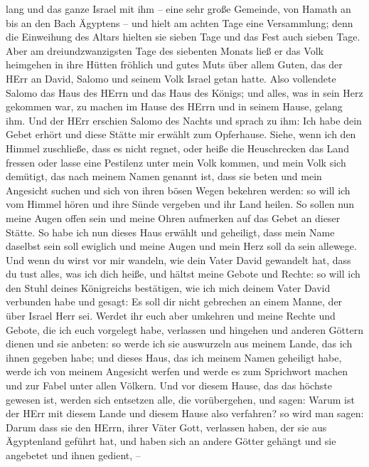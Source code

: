 lang und das ganze Israel mit ihm -- eine sehr große Gemeinde, von
Hamath an bis an den Bach Ägyptens --  und hielt am achten
Tage eine Versammlung; denn die Einweihung des Altars hielten sie sieben
Tage und das Fest auch sieben Tage.  Aber am
dreiundzwanzigsten Tage des siebenten Monats ließ er das Volk heimgehen
in ihre Hütten fröhlich und gutes Muts über allem Guten, das der HErr an
David, Salomo und seinem Volk Israel getan hatte.  Also
vollendete Salomo das Haus des HErrn und das Haus des Königs; und alles,
was in sein Herz gekommen war, zu machen im Hause des HErrn und in
seinem Hause, gelang ihm.  Und der HErr erschien Salomo des
Nachts und sprach zu ihm: Ich habe dein Gebet erhört und diese Stätte
mir erwählt zum Opferhause.  Siehe, wenn ich den Himmel
zuschließe, dass es nicht regnet, oder heiße die Heuschrecken das Land
fressen oder lasse eine Pestilenz unter mein Volk kommen, 
und mein Volk sich demütigt, das nach meinem Namen genannt ist, dass sie
beten und mein Angesicht suchen und sich von ihren bösen Wegen bekehren
werden: so will ich vom Himmel hören und ihre Sünde vergeben und ihr
Land heilen.  So sollen nun meine Augen offen sein und
meine Ohren aufmerken auf das Gebet an dieser Stätte.  So
habe ich nun dieses Haus erwählt und geheiligt, dass mein Name daselbst
sein soll ewiglich und meine Augen und mein Herz soll da sein allewege.
 Und wenn du wirst vor mir wandeln, wie dein Vater David
gewandelt hat, dass du tust alles, was ich dich heiße, und hältst meine
Gebote und Rechte:  so will ich den Stuhl deines
Königreichs bestätigen, wie ich mich deinem Vater David verbunden habe
und gesagt: Es soll dir nicht gebrechen an einem Manne, der über Israel
Herr sei.  Werdet ihr euch aber umkehren und meine Rechte
und Gebote, die ich euch vorgelegt habe, verlassen und hingehen und
anderen Göttern dienen und sie anbeten:  so werde ich sie
auswurzeln aus meinem Lande, das ich ihnen gegeben habe; und dieses
Haus, das ich meinem Namen geheiligt habe, werde ich von meinem
Angesicht werfen und werde es zum Sprichwort machen und zur Fabel unter
allen Völkern.  Und vor diesem Hause, das das höchste
gewesen ist, werden sich entsetzen alle, die vorübergehen, und sagen:
Warum ist der HErr mit diesem Lande und diesem Hause also verfahren?
 so wird man sagen: Darum dass sie den HErrn, ihrer Väter
Gott, verlassen haben, der sie aus Ägyptenland geführt hat, und haben
sich an andere Götter gehängt und sie angebetet und ihnen gedient, --
